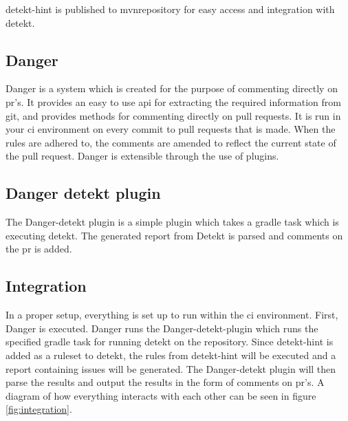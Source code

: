 \documentclass{report}
\begin{document}
detekt-hint is published to mvnrepository for easy access and integration with detekt.


\subsection{Danger}
Danger is a system which is created for the purpose of commenting directly on \gls{pr}'s. It provides an easy to use \gls{api} for extracting the required information from git, and provides methods for commenting directly on pull requests. It is run in your \gls{ci} environment on every commit to pull requests that is made. When the rules are adhered to, the comments are amended to reflect the current state of the pull request. Danger is extensible through the use of plugins.

\subsection{Danger detekt plugin}
The Danger-detekt plugin is a simple plugin which takes a gradle task which is executing detekt. The generated report from Detekt is parsed and comments on the \gls{pr} is added.

\subsection{Integration}
In a proper setup, everything is set up to run within the \gls{ci} environment. First, Danger is executed. Danger runs the Danger-detekt-plugin which runs the specified gradle task for running detekt on the repository. Since detekt-hint is added as a ruleset to detekt, the rules from detekt-hint will be executed and a report containing issues will be generated. The Danger-detekt plugin will then parse the results and output the results in the form of comments on \gls{pr}'s. A diagram of how everything interacts with each other can be seen in figure \ref{fig:integration}. 
\end{document}
